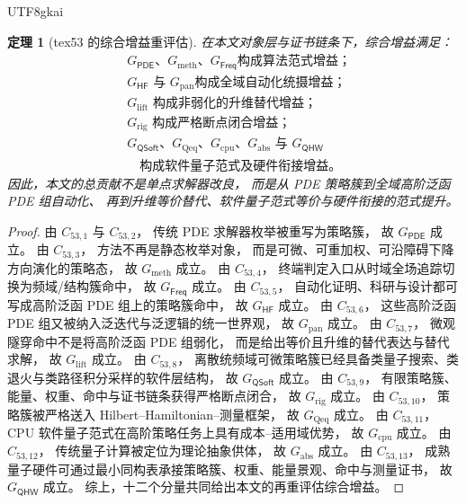 \documentclass[12pt]{article}
\newtheorem{theorem}{定理}[section]
\newcommand{\PDE}{\mathsf{PDE}}
\newcommand{\Freq}{\mathsf{Freq}}
\newcommand{\HF}{\mathsf{HF}}
\newcommand{\QSoft}{\mathsf{QSoft}}
\newcommand{\QHW}{\mathsf{QHW}}
\begin{document}
\begin{CJK*}{UTF8}{gkai}
\begin{theorem}[tex53 的综合增益重评估]
\label{thm:tex53-total-gain}
在本文对象层与证书链条下，综合增益满足：
\[
  \boxed{
    \begin{aligned}
      &G_{\PDE}\text{、}G_{\mathrm{meth}}\text{、}G_{\Freq}
      \text{构成算法范式增益；}\\
      &G_{\HF}\text{ 与 }G_{\mathrm{pan}}
      \text{构成全域自动化统摄增益；}\\
      &G_{\mathrm{lift}}\text{ 构成非弱化的升维替代增益；}\\
      &G_{\mathrm{rig}}\text{ 构成严格断点闭合增益；}\\
      &G_{\QSoft}\text{、}G_{\mathrm{Qeq}}\text{、}G_{\mathrm{cpu}}\text{、}
      G_{\mathrm{abs}}\text{ 与 }G_{\QHW}\\
      &\quad \text{构成软件量子范式及硬件衔接增益。}
    \end{aligned}
  }
\]
因此，本文的总贡献不是单点求解器改良，
而是从 PDE 策略簇到全域高阶泛函 PDE 组自动化、
再到升维等价替代、软件量子范式等价与硬件衔接的范式提升。
\end{theorem}

\begin{proof}
由 \(C_{53,1}\) 与 \(C_{53,2}\)，
传统 PDE 求解器枚举被重写为策略簇，
故 \(G_{\PDE}\) 成立。
由 \(C_{53,3}\)，
方法不再是静态枚举对象，
而是可微、可重加权、可沿障碍下降方向演化的策略态，
故 \(G_{\mathrm{meth}}\) 成立。
由 \(C_{53,4}\)，
终端判定入口从时域全场追踪切换为频域/结构簇命中，
故 \(G_{\Freq}\) 成立。
由 \(C_{53,5}\)，
自动化证明、科研与设计都可写成高阶泛函 PDE 组上的策略簇命中，
故 \(G_{\HF}\) 成立。
由 \(C_{53,6}\)，
这些高阶泛函 PDE 组又被纳入泛迭代与泛逻辑的统一世界观，
故 \(G_{\mathrm{pan}}\) 成立。
由 \(C_{53,7}\)，
微观隧穿命中不是将高阶泛函 PDE 组弱化，
而是给出等价且升维的替代表达与替代求解，
故 \(G_{\mathrm{lift}}\) 成立。
由 \(C_{53,8}\)，
离散统频域可微策略簇已经具备类量子搜索、类退火与类路径积分采样的软件层结构，
故 \(G_{\QSoft}\) 成立。
由 \(C_{53,9}\)，
有限策略簇、能量、权重、命中与证书链条获得严格断点闭合，
故 \(G_{\mathrm{rig}}\) 成立。
由 \(C_{53,10}\)，
策略簇被严格送入 Hilbert--Hamiltonian--测量框架，
故 \(G_{\mathrm{Qeq}}\) 成立。
由 \(C_{53,11}\)，
CPU 软件量子范式在高阶策略任务上具有成本--适用域优势，
故 \(G_{\mathrm{cpu}}\) 成立。
由 \(C_{53,12}\)，
传统量子计算被定位为理论抽象供体，
故 \(G_{\mathrm{abs}}\) 成立。
由 \(C_{53,13}\)，
成熟量子硬件可通过最小同构表承接策略簇、权重、能量景观、命中与测量证书，
故 \(G_{\QHW}\) 成立。
综上，十二个分量共同给出本文的再重评估综合增益。
\end{proof}


\end{CJK*}
\end{document}
